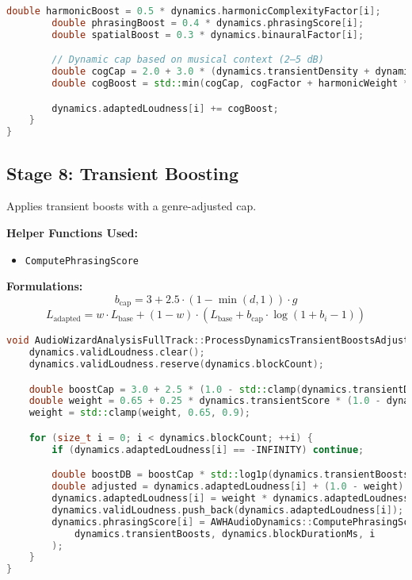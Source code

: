 \documentclass[11pt]{article}
\begin{document}
\begin{lstlisting}[language=C++]
		double harmonicBoost = 0.5 * dynamics.harmonicComplexityFactor[i];
		double phrasingBoost = 0.4 * dynamics.phrasingScore[i];
		double spatialBoost = 0.3 * dynamics.binauralFactor[i];

		// Dynamic cap based on musical context (2–5 dB)
		double cogCap = 2.0 + 3.0 * (dynamics.transientDensity + dynamics.genreFactor) / 2.0;
		double cogBoost = std::min(cogCap, cogFactor + harmonicWeight * harmonicBoost + rhythmWeight * phrasingBoost + spatialBoost);

		dynamics.adaptedLoudness[i] += cogBoost;
	}
}
\end{lstlisting}

\subsection{Stage 8: Transient Boosting}
Applies transient boosts with a genre-adjusted cap.

\textbf{Helper Functions Used:}
\begin{itemize}
  \item \texttt{ComputePhrasingScore}
\end{itemize}

\textbf{Formulations:}
\begin{equation}
b_{\text{cap}} = 3 + 2.5 \cdot (1 - \min(d, 1)) \cdot g
\end{equation}
\begin{equation}
L_{\text{adapted}} = w \cdot L_{\text{base}} + (1 - w) \cdot (L_{\text{base}} + b_{\text{cap}} \cdot \log(1 + b_i - 1))
\end{equation}

\begin{lstlisting}[language=C++]
void AudioWizardAnalysisFullTrack::ProcessDynamicsTransientBoostsAdjustment(FullTrackDataDynamics& dynamics) {
	dynamics.validLoudness.clear();
	dynamics.validLoudness.reserve(dynamics.blockCount);

	double boostCap = 3.0 + 2.5 * (1.0 - std::clamp(dynamics.transientDensity, 0.0, 1.0)) * dynamics.genreFactor; // 3–5.5 dB
	double weight = 0.65 + 0.25 * dynamics.transientScore * (1.0 - dynamics.transientDensity); // 0.65–0.9
	weight = std::clamp(weight, 0.65, 0.9);

	for (size_t i = 0; i < dynamics.blockCount; ++i) {
		if (dynamics.adaptedLoudness[i] == -INFINITY) continue;

		double boostDB = boostCap * std::log1p(dynamics.transientBoosts[i] - 1.0);
		double adjusted = dynamics.adaptedLoudness[i] + (1.0 - weight) * boostDB;
		dynamics.adaptedLoudness[i] = weight * dynamics.adaptedLoudness[i] + (1.0 - weight) * adjusted;
		dynamics.validLoudness.push_back(dynamics.adaptedLoudness[i]);
		dynamics.phrasingScore[i] = AWHAudioDynamics::ComputePhrasingScore(
			dynamics.transientBoosts, dynamics.blockDurationMs, i
		);
	}
}
\end{lstlisting}
\end{document}
